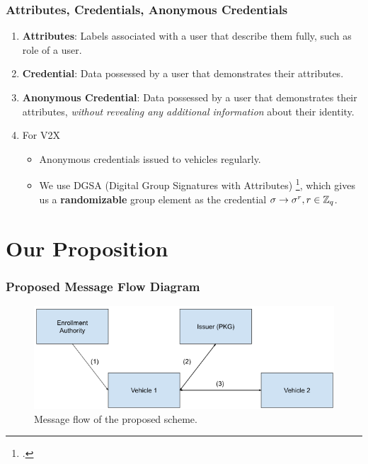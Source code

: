 \documentclass{beamer}
\begin{document}
    \begin{frame}
        \frametitle{Attributes, Credentials, Anonymous Credentials}
        \begin{enumerate}
            \item<1-> \textbf{Attributes}: Labels associated with a user that
            describe them fully, such as role of a user.
            \item<2-> \textbf{Credential}: Data possessed by a user that
            demonstrates their attributes.
            \item<3-> \textbf{Anonymous Credential}: Data possessed by a user
            that demonstrates their attributes, \emph{without revealing any
            additional information} about their identity.
            \item<4-> For V2X
            \begin{itemize}
                \item Anonymous credentials issued to vehicles regularly.
                \item We use DGSA (Digital Group Signatures with Attributes)
                \footcite{camenischZoneEncryptionAnonymous2020}, which gives us
                a \textbf{randomizable} group element as the credential \(\sigma
                \rightarrow \sigma^r, r \in \mathbb Z_q\).
            \end{itemize}
        \end{enumerate}
    \end{frame}

    \section{Our Proposition}
    \begin{frame}
        \frametitle{Proposed Message Flow Diagram}
        \begin{figure}
            \centering
            \includegraphics[width=\columnwidth]{figs/flow.png}
            \caption{Message flow of the proposed scheme.}
            \label{fig:new-flow}
        \end{figure}
    \end{frame}
\end{document}
